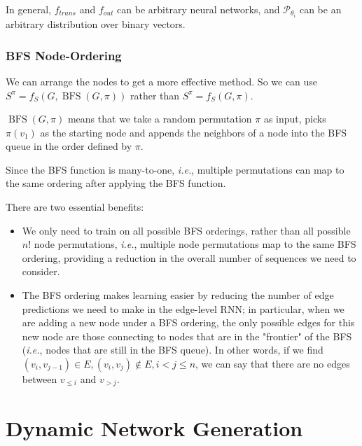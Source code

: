 \begin{survey}
\vspace{0.2cm}

In general, \(f_{trans}\) and \(f_{out}\) can be arbitrary neural
networks, and \(\mathcal{P}_{\theta_{i}}\) can be an arbitrary
distribution over binary vectors.

\subsubsection{BFS Node-Ordering}

We can arrange the nodes to get a more effective method. So we can use
\(S^{\pi}=f_{S}(G, \operatorname{BFS}(G, \pi))\) rather than
\(S^{\pi}=f_{S}(G, \pi)\).

\(\operatorname{BFS}(G, \pi)\) means that we take a random permutation
\(\pi\) as input, picks \(π(v_1)\) as the starting node and appends the
neighbors of a node into the BFS queue in the order defined by \(\pi\).

Since the BFS function is many-to-one, \emph{i.e.}, multiple
permutations can map to the same ordering after applying the BFS
function.

There are two essential benefits:

\begin{itemize}
\item
  We only need to train on all possible BFS orderings, rather than all
  possible \(n!\) node permutations, \emph{i.e.}, multiple node
  permutations map to the same BFS ordering, providing a reduction in
  the overall number of sequences we need to consider.
\item
  The BFS ordering makes learning easier by reducing the number of edge
  predictions we need to make in the edge-level RNN; in particular, when
  we are adding a new node under a BFS ordering, the only possible edges
  for this new node are those connecting to nodes that are in the
  "frontier" of the BFS (\emph{i.e.}, nodes that are still in the BFS
  queue). In other words, if we find
  \((v_i, v_{j-1})\in E, (v_i, v_{j})\notin E, i < j \le n\), we can say
  that there are no edges between \(v_{\le i}\) and \(v_{>j}\).
\end{itemize}

\vspace{0.2cm}

\section{Dynamic Network Generation}


\end{survey}
